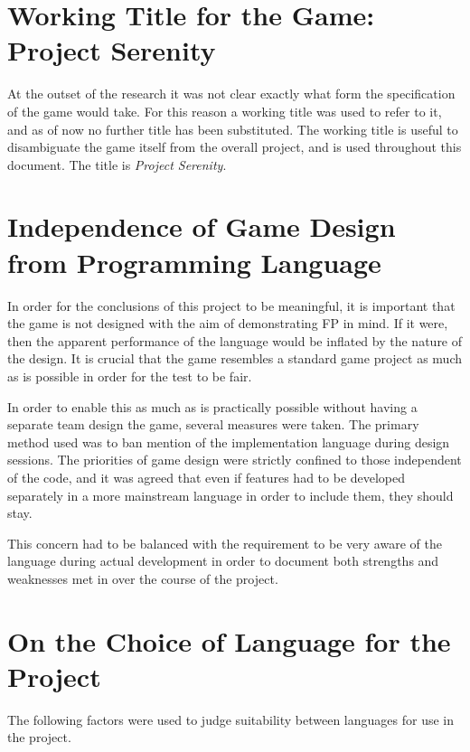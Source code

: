 \section{Working Title for the Game: Project Serenity}

At the outset of the research it was not clear exactly what form the specification of the game would take. For this reason a working title was used to refer to it, and as of now no further title has been substituted. The working title is useful to disambiguate the game itself from the overall project, and is used throughout this document. The title is \emph{Project Serenity}.

\section{Independence of Game Design from Programming Language}

In order for the conclusions of this project to be meaningful, it is important that the game is not designed with the aim of demonstrating FP in mind. If it were, then the apparent performance of the language would be inflated by the nature of the design. It is crucial that the game resembles a standard game project as much as is possible in order for the test to be fair.

In order to enable this as much as is practically possible without having a separate team design the game, several measures were taken. The primary method used was to ban mention of the implementation language during design sessions. The priorities of game design were strictly confined to those independent of the code, and it was agreed that even if features had to be developed separately in a more mainstream language in order to include them, they should stay. 

This concern had to be balanced with the requirement to be very aware of the language during actual development in order to document both strengths and weaknesses met in over the course of the project.


\section{On the Choice of Language for the Project}

The following factors were used to judge suitability between languages for use in the project.

